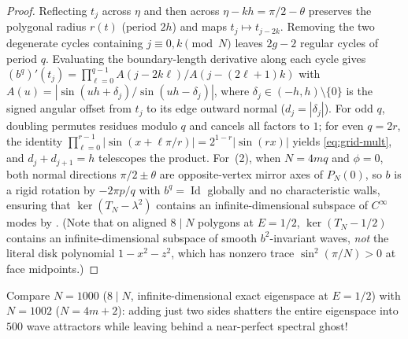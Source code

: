 \documentclass[11pt,reqno]{amsart}
\theoremstyle{definition}
\theoremstyle{remark}
\DeclareMathOperator{\Id}{Id}
\begin{document}
\begin{proof}
Reflecting $t_j$ across $\eta$ and then across $\eta - kh = \pi/2 - \theta$ preserves the polygonal radius $r(t)$ (period $2h$) and maps $t_j \mapsto t_{j-2k}$. Removing the two degenerate cycles containing $j \equiv 0, k \pmod N$ leaves $2g - 2$ regular cycles of period $q$. Evaluating the boundary-length derivative along each cycle gives $(b^q)'(t_j) = \prod_{\ell=0}^{q-1} A(j - 2k\ell)/A(j - (2\ell+1)k)$ with $A(u) = |\sin(uh+\delta_j)/\sin(uh-\delta_j)|$, where $\delta_j \in (-h, h) \setminus \{0\}$ is the signed angular offset from $t_j$ to its edge outward normal ($d_j = |\delta_j|$). For odd $q$, doubling permutes residues modulo $q$ and cancels all factors to $1$; for even $q = 2r$, the identity $\prod_{\ell=0}^{r-1}|\sin(x + \ell\pi/r)| = 2^{1-r}|\sin(rx)|$ yields \eqref{eq:grid-mult}, and $d_j + d_{j+1} = h$ telescopes the product. For~(2), when $N = 4mq$ and $\phi = 0$, both normal directions $\pi/2 \pm \theta$ are opposite-vertex mirror axes of $P_N(0)$, so $b$ is a rigid rotation by $-2\pi p/q$ with $b^q = \Id$ globally and no characteristic walls, ensuring that $\ker(T_N - \lambda^2)$ contains an infinite-dimensional subspace of $C^\infty$ modes by \cite[Thm.~2.2]{Paper1}. (Note that on aligned $8 \mid N$ polygons at $E = 1/2$, $\ker(T_N - 1/2)$ contains an infinite-dimensional subspace of smooth $b^2$-invariant waves, \emph{not} the literal disk polynomial $1 - x^2 - z^2$, which has nonzero trace $\sin^2(\pi/N) > 0$ at face midpoints.)
\end{proof}

Compare $N = 1000$ ($8 \mid N$, infinite-dimensional exact eigenspace at $E = 1/2$) with $N = 1002$ ($N = 4m+2$): adding just two sides shatters the entire eigenspace into $500$ wave attractors while leaving behind a near-perfect spectral ghost!
\end{document}
